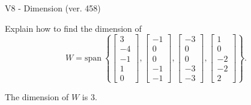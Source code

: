 \begin{exercise}
  \begin{exerciseTitle}V8 - Dimension (ver. 458)\end{exerciseTitle}
  \begin{exerciseStatement}
    Explain how to find the dimension of 
\[W=\mathrm{span}\ \left\{\left[\begin{array}{r}
3 \\
-4 \\
-1 \\
1 \\
0
\end{array}\right] , \left[\begin{array}{r}
-1 \\
0 \\
0 \\
-1 \\
-1
\end{array}\right] , \left[\begin{array}{r}
-3 \\
0 \\
0 \\
-3 \\
-3
\end{array}\right] , \left[\begin{array}{r}
1 \\
0 \\
-2 \\
-2 \\
2
\end{array}\right]\right\}.\]



  \end{exerciseStatement}
  \begin{exerciseAnswer}
   The dimension of \(W\) is  \(3\).
  


  \end{exerciseAnswer}
\end{exercise}